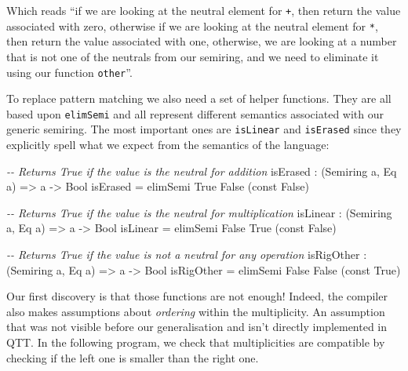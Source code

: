 \documentclass[
]{article}
\newenvironment{Shaded}{}{}
\newcommand{\CommentTok}[1]{\textcolor[rgb]{0.38,0.63,0.69}{\textit{#1}}}
\newcommand{\DataTypeTok}[1]{\textcolor[rgb]{0.56,0.13,0.00}{#1}}
\newcommand{\FunctionTok}[1]{\textcolor[rgb]{0.02,0.16,0.49}{#1}}
\newcommand{\NormalTok}[1]{#1}
\newcommand{\OperatorTok}[1]{\textcolor[rgb]{0.40,0.40,0.40}{#1}}
\newcommand{\OtherTok}[1]{\textcolor[rgb]{0.00,0.44,0.13}{#1}}
\begin{document}
Which reads ``if we are looking at the neutral element for \texttt{+},
then return the value associated with zero, otherwise if we are looking
at the neutral element for \texttt{*}, then return the value associated
with one, otherwise, we are looking at a number that is not one of the
neutrals from our semiring, and we need to eliminate it using our
function \texttt{other}''.

To replace pattern matching we also need a set of helper functions. They
are all based upon \texttt{elimSemi} and all represent different
semantics associated with our generic semiring. The most important ones
are \texttt{isLinear} and \texttt{isErased} since they explicitly spell
what we expect from the semantics of the language:

\begin{Shaded}
\begin{Highlighting}[]
\CommentTok{{-}{-} Returns True if the value is the neutral for addition}
\NormalTok{isErased }\OperatorTok{:}\NormalTok{ (}\DataTypeTok{Semiring}\NormalTok{ a, }\DataTypeTok{Eq}\NormalTok{ a) }\OtherTok{=\textgreater{}}\NormalTok{ a }\OtherTok{{-}\textgreater{}} \DataTypeTok{Bool}
\NormalTok{isErased }\OtherTok{=}\NormalTok{ elimSemi }\DataTypeTok{True} \DataTypeTok{False}\NormalTok{ (}\FunctionTok{const} \DataTypeTok{False}\NormalTok{)}

\CommentTok{{-}{-} Returns True if the value is the neutral for multiplication}
\NormalTok{isLinear }\OperatorTok{:}\NormalTok{ (}\DataTypeTok{Semiring}\NormalTok{ a, }\DataTypeTok{Eq}\NormalTok{ a) }\OtherTok{=\textgreater{}}\NormalTok{ a }\OtherTok{{-}\textgreater{}} \DataTypeTok{Bool}
\NormalTok{isLinear }\OtherTok{=}\NormalTok{ elimSemi }\DataTypeTok{False} \DataTypeTok{True}\NormalTok{ (}\FunctionTok{const} \DataTypeTok{False}\NormalTok{)}

\CommentTok{{-}{-} Returns True if the value is not a neutral for any operation}
\NormalTok{isRigOther }\OperatorTok{:}\NormalTok{ (}\DataTypeTok{Semiring}\NormalTok{ a, }\DataTypeTok{Eq}\NormalTok{ a) }\OtherTok{=\textgreater{}}\NormalTok{ a }\OtherTok{{-}\textgreater{}} \DataTypeTok{Bool}
\NormalTok{isRigOther }\OtherTok{=}\NormalTok{ elimSemi }\DataTypeTok{False} \DataTypeTok{False}\NormalTok{ (}\FunctionTok{const} \DataTypeTok{True}\NormalTok{)}
\end{Highlighting}
\end{Shaded}

Our first discovery is that those functions are not enough! Indeed, the
compiler also makes assumptions about \emph{ordering} within the
multiplicity. An assumption that was not visible before our
generalisation and isn't directly implemented in QTT. In the following
program, we check that multiplicities are compatible by checking if the
left one is smaller than the right one.
\end{document}
